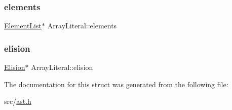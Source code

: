 \subsubsection{\texorpdfstring{elements}{elements}}
{\footnotesize\ttfamily \hyperlink{struct_element_list}{Element\+List}$\ast$ Array\+Literal\+::elements}

\mbox{\label{struct_array_literal_a08fa9ad6e83376bb2a70d22df9cf2c8a}} 
\subsubsection{\texorpdfstring{elision}{elision}}
{\footnotesize\ttfamily \hyperlink{struct_elision}{Elision}$\ast$ Array\+Literal\+::elision}



The documentation for this struct was generated from the following file\+:\begin{DoxyCompactItemize}
\item 
src/\hyperlink{ast_8h}{ast.\+h}\end{DoxyCompactItemize}
